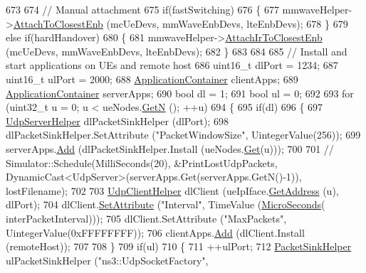 \begin{DoxyCode}
{673 
674   \textcolor{comment}{// Manual attachment}
675   \textcolor{keywordflow}{if}(fastSwitching)
676   \{
677     mmwaveHelper->\hyperlink{classns3_1_1MmWaveHelper_a202baea67b0af0d4fb6069de73766dc6}{AttachToClosestEnb} (mcUeDevs, mmWaveEnbDevs, lteEnbDevs);  
678   \}
679   \textcolor{keywordflow}{else} \textcolor{keywordflow}{if}(hardHandover)
680   \{
681     mmwaveHelper->\hyperlink{classns3_1_1MmWaveHelper_ac3583459711ca8e019f1a6e58ec37c1f}{AttachIrToClosestEnb} (mcUeDevs, mmWaveEnbDevs, lteEnbDevs);
682   \}
683   
684 
685   \textcolor{comment}{// Install and start applications on UEs and remote host}
686   uint16\_t dlPort = 1234;
687   uint16\_t ulPort = 2000;
688   \hyperlink{classns3_1_1ApplicationContainer}{ApplicationContainer} clientApps;
689   \hyperlink{classns3_1_1ApplicationContainer}{ApplicationContainer} serverApps;
690   \textcolor{keywordtype}{bool} dl = 1;
691   \textcolor{keywordtype}{bool} ul = 0;
692 
693   \textcolor{keywordflow}{for} (uint32\_t u = 0; u < ueNodes.\hyperlink{classns3_1_1NodeContainer_aed647ac56d0407a7706aba02eb44b951}{GetN} (); ++u)
694   \{
695       \textcolor{keywordflow}{if}(dl)
696       \{
697         \hyperlink{classns3_1_1UdpServerHelper}{UdpServerHelper} dlPacketSinkHelper (dlPort);
698         dlPacketSinkHelper.SetAttribute (\textcolor{stringliteral}{"PacketWindowSize"}, UintegerValue(256));
699         serverApps.\hyperlink{classns3_1_1ApplicationContainer_ad09ab1a1ad5849d518d5f4c262e38152}{Add} (dlPacketSinkHelper.Install (ueNodes.\hyperlink{classns3_1_1NodeContainer_a9ed96e2ecc22e0f5a3d4842eb9bf90bf}{Get}(u)));
700 
701         \textcolor{comment}{// Simulator::Schedule(MilliSeconds(20), &PrintLostUdpPackets,
       DynamicCast<UdpServer>(serverApps.Get(serverApps.GetN()-1)), lostFilename);}
702 
703         \hyperlink{classns3_1_1UdpClientHelper}{UdpClientHelper} dlClient (ueIpIface.\hyperlink{classns3_1_1Ipv4InterfaceContainer_ae63208dcd222be986822937ee4aa828c}{GetAddress} (u), dlPort);
704         dlClient.\hyperlink{classns3_1_1UdpClientHelper_a8bbae16a28f85ab3f3b5aa4642edfeae}{SetAttribute} (\textcolor{stringliteral}{"Interval"}, TimeValue (\hyperlink{group__timecivil_ga17465a639c8d1464e76538afdd78a9f0}{MicroSeconds}(
      interPacketInterval)));
705         dlClient.SetAttribute (\textcolor{stringliteral}{"MaxPackets"}, UintegerValue(0xFFFFFFFF));
706         clientApps.\hyperlink{classns3_1_1ApplicationContainer_ad09ab1a1ad5849d518d5f4c262e38152}{Add} (dlClient.Install (remoteHost));
707 
708       \}
709       \textcolor{keywordflow}{if}(ul)
710       \{
711         ++ulPort;
712         \hyperlink{classns3_1_1PacketSinkHelper}{PacketSinkHelper} ulPacketSinkHelper (\textcolor{stringliteral}{"ns3::UdpSocketFactory"}, 
}
\end{DoxyCode}
